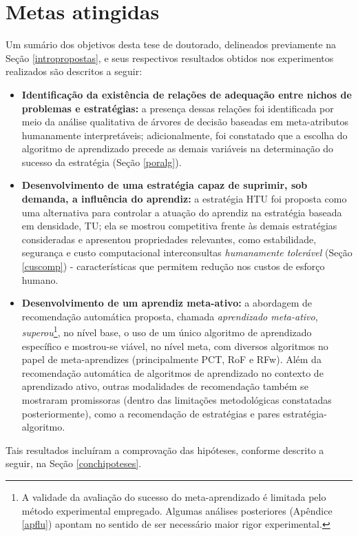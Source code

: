 \section{Metas atingidas}\label{metas}
Um sumário dos objetivos desta tese de doutorado, delineados previamente na Seção \ref{intropropostas}, e seus respectivos resultados obtidos nos experimentos realizados são descritos a seguir:
\begin{itemize}
   \item \textbf{Identificação da existência de relações de adequação entre nichos de problemas e estratégias:} a presença dessas relações foi identificada por meio da análise qualitativa de árvores de decisão baseadas em meta-atributos humanamente interpretáveis; adicionalmente, foi constatado que a escolha do algoritmo de aprendizado precede as demais variáveis na determinação do sucesso da estratégia (Seção \ref{poralg}).
   \item \textbf{Desenvolvimento de uma estratégia capaz de suprimir, sob demanda, a influência do aprendiz:} a estratégia HTU foi proposta como uma alternativa para controlar a atuação do aprendiz na estratégia baseada em densidade, TU; ela se mostrou competitiva frente às demais estratégias consideradas e apresentou propriedades relevantes, como estabilidade, segurança e custo computacional interconsultas \textit{humanamente tolerável} (Seção \ref{cuscomp}) - características que permitem redução nos custos de esforço humano.
   \item \textbf{Desenvolvimento de um aprendiz meta-ativo:} a abordagem de recomendação automática proposta, chamada \textit{aprendizado meta-ativo}, \textit{superou}\footnote{A validade da avaliação do sucesso do meta-aprendizado é limitada pelo método experimental empregado. Algumas análises posteriores (Apêndice \ref{apflu}) apontam no sentido de ser necessário maior rigor experimental.}, no nível base, o uso de um único algoritmo de aprendizado específico e mostrou-se viável, no nível meta, com diversos algoritmos no papel de meta-aprendizes (principalmente PCT, RoF e RFw).
   Além da recomendação automática de algoritmos de aprendizado no contexto de aprendizado ativo, outras modalidades de recomendação também se mostraram promissoras (dentro das limitações metodológicas constatadas posteriormente), como a recomendação de estratégias e pares estratégia-algoritmo.
\end{itemize}
Tais resultados incluíram a comprovação das hipóteses, conforme descrito a seguir, na Seção \ref{conchipoteses}.

